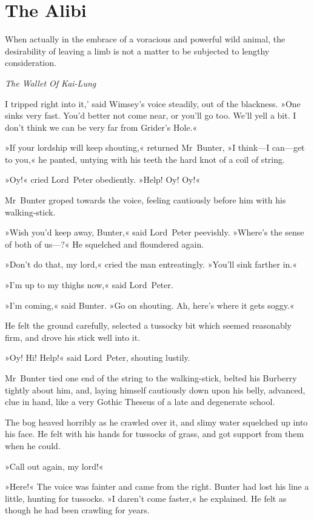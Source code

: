 
\chapter{The Alibi}

\epigraph{When actually in the embrace of a voracious and powerful wild animal, the desirability of leaving a limb is not a matter to be subjected to
lengthy consideration.}{\textit{The Wallet Of Kai-Lung}}

\lettrine[lines=4,ante=`]{I}{} tripped right into it,' said Wimsey's voice steadily, out of the blackness. »One sinks very fast. You'd better not come near, or you'll go too. We'll yell a bit. I don't think we can be very far from Grider's Hole.«

\zz
»If your lordship will keep shouting,« returned Mr~Bunter, »I think—I can—get to you,« he panted, untying with his teeth the hard knot of a coil of string.

»Oy!« cried Lord~Peter obediently. »Help! Oy! Oy!«

Mr~Bunter groped towards the voice, feeling cautiously before him with his walking-stick.

»Wish you'd keep away, Bunter,« said Lord~Peter peevishly. »Where's the sense of both of us—?« He squelched and floundered again.

»Don't do that, my lord,« cried the man entreatingly. »You'll sink farther in.«

»I'm up to my thighs now,« said Lord~Peter.

»I'm coming,« said Bunter. »Go on shouting. Ah, here's where it gets soggy.«

He felt the ground carefully, selected a tussocky bit which seemed reasonably firm, and drove his stick well into it.

»Oy! Hi! Help!« said Lord~Peter, shouting lustily.

Mr~Bunter tied one end of the string to the walking-stick, belted his Burberry tightly about him, and, laying himself cautiously down upon his belly, advanced, clue in hand, like a very Gothic Theseus of a late and degenerate school.

The bog heaved horribly as he crawled over it, and slimy water squelched up into his face. He felt with his hands for tussocks of grass, and got support from them when he could.

»Call out again, my lord!«

»Here!« The voice was fainter and came from the right. Bunter had lost his line a little, hunting for tussocks. »I daren't come faster,« he explained. He felt as though he had been crawling for years.

